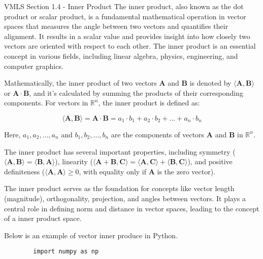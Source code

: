 \begin{notes}{VMLS Section 1.4 - Inner Product}
    The inner product, also known as the dot product or scalar product, is a fundamental mathematical operation in vector spaces that measures the angle between two vectors and quantifies their alignment. It results in a 
    scalar value and provides insight into how closely two vectors are oriented with respect to each other. The inner product is an essential concept in various fields, including linear algebra, physics, engineering, and 
    computer graphics.

    \begin{Highlight}
        Mathematically, the inner product of two vectors \(\mathbf{A}\) and \(\mathbf{B}\) is denoted by \(\langle \mathbf{A}, \mathbf{B} \rangle\) or \(\mathbf{A} \cdot \mathbf{B}\), and it's calculated by summing the 
        products of their corresponding components. For vectors in \(\mathbb{R}^n\), the inner product is defined as:

        \[
        \langle \mathbf{A}, \mathbf{B} \rangle = \mathbf{A} \cdot \mathbf{B} = a_1 \cdot b_1 + a_2 \cdot b_2 + \ldots + a_n \cdot b_n
        \]
    
        Here, \(a_1, a_2, \ldots, a_n\) and \(b_1, b_2, \ldots, b_n\) are the components of vectors \(\mathbf{A}\) and \(\mathbf{B}\) in \(\mathbb{R}^n\).
    \end{Highlight}

    The inner product has several important properties, including symmetry (\(\langle \mathbf{A}, \mathbf{B} \rangle = \langle \mathbf{B}, \mathbf{A} \rangle\)), linearity (\(\langle \mathbf{A} + \mathbf{B}, \mathbf{C} 
    \rangle = \langle \mathbf{A}, \mathbf{C} \rangle + \langle \mathbf{B}, \mathbf{C} \rangle\)), and positive definiteness (\(\langle \mathbf{A}, \mathbf{A} \rangle \geq 0\), with equality only if \(\mathbf{A}\) is 
    the zero vector).

    The inner product serves as the foundation for concepts like vector length (magnitude), orthogonality, projection, and angles between vectors. It plays a central role in defining norm and distance in vector spaces, 
    leading to the concept of a inner product space.

    \begin{Highlight}
        Below is an example of vector inner produce in Python.

        \begin{verbatim}
        import numpy as np


\end{verbatim}
\end{Highlight}
\end{notes}
